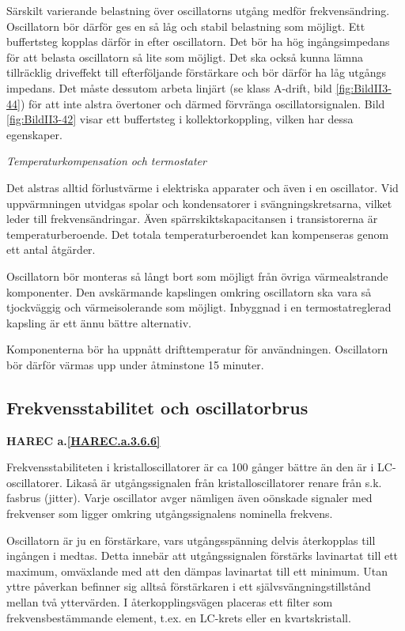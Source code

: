 Särskilt varierande belastning över oscillatorns utgång medför
frekvensändring. Oscillatorn bör därför ges en så låg och stabil
belastning som möjligt. Ett buffertsteg kopplas därför in efter
oscillatorn. Det bör ha hög ingångsimpedans för att belasta
oscillatorn så lite som möjligt. Det ska också kunna lämna
tillräcklig driveffekt till efterföljande förstärkare och bör därför
ha låg utgångs impedans. Det måste dessutom arbeta linjärt (se klass
A-drift, bild \ref{fig:BildII3-44}) för att inte alstra övertoner och därmed
förvränga oscillatorsignalen. Bild \ref{fig:BildII3-42} visar ett buffertsteg i
kollektorkoppling, vilken har dessa egenskaper.

\emph{Temperaturkompensation och termostater}

Det alstras alltid förlustvärme i elektriska apparater och även i en
oscillator. Vid uppvärmningen utvidgas spolar och kondensatorer i
svängningskretsarna, vilket leder till frekvensändringar. Även
spärrskiktskapacitansen i transistorerna är temperaturberoende. Det
totala temperaturberoendet kan kompenseras genom ett antal åtgärder.

Oscillatorn bör monteras så långt bort som möjligt från övriga
värmealstrande komponenter. Den avskärmande kapslingen omkring
oscillatorn ska vara så tjockväggig och värmeisolerande som
möjligt. Inbyggnad i en termostatreglerad kapsling är ett ännu bättre
alternativ.

Komponenterna bör ha uppnått drifttemperatur för
användningen. Oscillatorn bör därför värmas upp under åtminstone 15
minuter.

\subsection{Frekvensstabilitet och oscillatorbrus}
\textbf{HAREC a.\ref{HAREC.a.3.6.6}\label{myHAREC.a.3.6.6}}

Frekvensstabiliteten i kristalloscillatorer är ca 100 gånger bättre än
den är i LC-oscillatorer. Likaså är utgångssignalen från
kristalloscillatorer renare från s.k. fasbrus (jitter). Varje
oscillator avger nämligen även oönskade signaler med frekvenser som
ligger omkring utgångssignalens nominella frekvens.

Oscillatorn är ju en förstärkare, vars utgångsspänning delvis
återkopplas till ingången i medtas. Detta innebär att utgångssignalen
förstärks lavinartat till ett maximum, omväxlande med att den dämpas
lavinartat till ett minimum. Utan yttre påverkan befinner sig alltså
förstärkaren i ett självsvängningstillstånd mellan två yttervärden. I
återkopplingsvägen placeras ett filter som frekvensbestämmande
element, t.ex. en LC-krets eller en kvartskristall.

